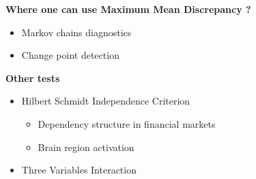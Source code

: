 \documentclass[landscape,a0]{a0poster_csml_v2}
\begin{document}
\begin{poster}
\begin{PosterColumn}
\begin{minipage}[c]{0.5\textwidth}
\textbf{Where one can use Maximum Mean Discrepancy ?}
\begin{itemize}[leftmargin=1in]	
	\item Markov chains diagnostics
	\item Change point detection
\end{itemize}
\textbf{ Other tests}
\begin{itemize}[leftmargin=1in]	
	\item Hilbert Schmidt Independence Criterion
		\begin{itemize}		
			\item Dependency structure in financial markets 
			\item Brain region activation
		\end{itemize}
	\item Three Variables Interaction 	
\end{itemize}
	
\end{minipage}   





\end{PosterColumn}
\end{poster}
\end{document}
